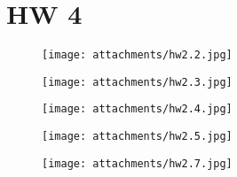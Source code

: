 \documentclass{article}
\theoremstyle{theorem}
\theoremstyle{definition}
\theoremstyle{remark}
\begin{document}
\section*{HW 4}

\begin{figure}[H]
    \centering
    \texttt{[image: attachments/hw2.2.jpg]} %
\end{figure}

\begin{figure}[H]
    \centering
    \texttt{[image: attachments/hw2.3.jpg]} %
\end{figure}

\begin{figure}[H]
    \centering
    \texttt{[image: attachments/hw2.4.jpg]} %
\end{figure}

\begin{figure}[H]
    \centering
    \texttt{[image: attachments/hw2.5.jpg]} %
\end{figure}

\begin{figure}[H]
    \centering
    \texttt{[image: attachments/hw2.7.jpg]} %
\end{figure}
\end{document}
